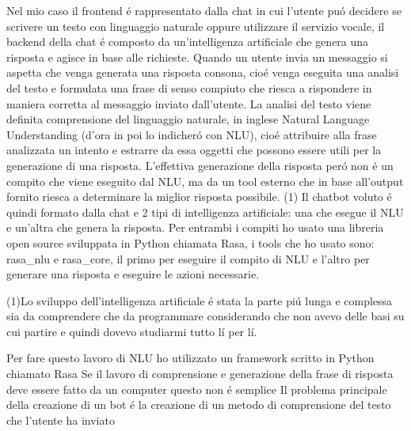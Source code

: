 Nel mio caso il frontend \'e rappresentato dalla chat in cui l'utente pu\'o decidere se scrivere un testo con linguaggio naturale oppure utilizzare il servizio vocale, il backend della chat \'e composto da un'intelligenza artificiale che genera una risposta e agisce in base alle richieste.
Quando un utente invia un messaggio si aspetta che venga generata una risposta consona, cio\'e venga eseguita una analisi del testo e formulata una frase di senso compiuto che riesca a rispondere in maniera corretta al messaggio inviato dall'utente. La analisi del testo viene definita comprensione del linguaggio naturale, in inglese Natural Language Understanding (d'ora in poi lo indicher\'o con NLU), cio\'e attribuire alla frase analizzata un intento e estrarre da essa oggetti che possono essere utili per la generazione di una risposta. L'effettiva generazione della risposta per\'o non \'e un compito che viene eseguito dal NLU, ma da un tool esterno che in base all'output fornito riesca a determinare la miglior risposta possibile.
(1)
Il chatbot voluto \'e quindi formato dalla chat e 2 tipi di intelligenza artificiale: una che esegue il NLU e un'altra che genera la risposta.
Per entrambi i compiti ho usato una libreria open source sviluppata in Python chiamata Rasa, i tools che ho usato sono: rasa\_nlu e rasa\_core, il primo per eseguire il compito di NLU e l'altro per generare una risposta e eseguire le azioni necessarie.





(1)Lo sviluppo dell'intelligenza artificiale \'e stata la parte pi\'u lunga e complessa sia da comprendere che da programmare considerando che non avevo delle basi su cui partire e quindi dovevo studiarmi tutto l\'i per l\'i.

Per fare questo lavoro di NLU ho utilizzato un framework scritto in Python chiamato Rasa
Se il lavoro di comprensione e generazione della frase di risposta deve essere fatto da un computer questo non \'e semplice
Il problema principale della creazione di un bot \'e la creazione di un metodo di comprensione del testo che l'utente ha inviato



